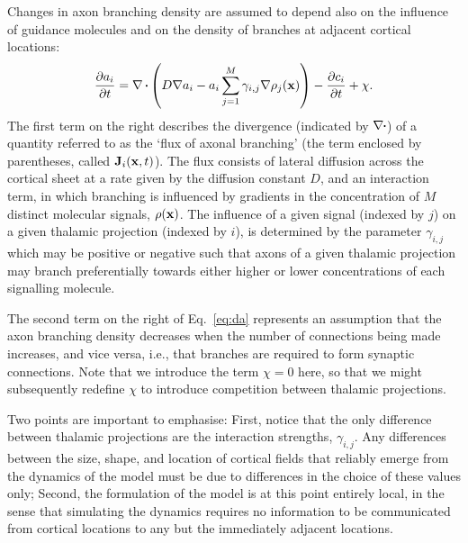 \documentclass[9pt,twocolumn,twoside,lineno]{pnas-new}
\begin{document}
Changes in axon branching density are assumed to depend also on the influence
of guidance molecules and on the density of branches at adjacent cortical
locations:
%
\begin{equation} \label{eq:da}
\frac{\partial a_i}{\partial t} = \nabla\vcdot\left(D \nabla a_i-a_i\sum_{j=1}^{M} \gamma_{i,j}\nabla \rho_j(\mb{x})\right) - \frac{\partial c_i}{\partial t} + \chi.
\end{equation}
%
The first term on the right describes the divergence (indicated by
$\nabla\vcdot$) of a quantity referred to as the `flux of axonal branching'
(the term enclosed by parentheses, called $\mathbf{J}_i(\mathbf{x},t)$).
The flux consists of lateral diffusion across the cortical sheet at a rate
given by the diffusion constant $D$, and an interaction term, in which
branching is influenced by gradients in the concentration of $M$ distinct
molecular signals, $\rho(\mathbf{x})$. The influence of a given signal (indexed by
$j$) on a given thalamic projection (indexed by $i$), is determined by the
parameter $\gamma_{i,j}$ which may be positive or negative such that axons of
a given thalamic projection may branch preferentially towards either higher or
lower concentrations of each signalling molecule.

The second term on the right of Eq.~\ref{eq:da} represents an assumption that the
axon branching density decreases when the number of connections being made
increases, and vice versa, i.e., that branches are required to form synaptic
connections. Note that we introduce the term $\chi=0$ here, so that we might
subsequently redefine $\chi$ to introduce competition between thalamic
projections.

Two points are important to emphasise: First, notice that the only
difference between thalamic projections are the interaction strengths,
$\gamma_{i,j}$. Any differences between the size, shape, and location of
cortical fields that reliably emerge from the dynamics of the model must be
due to differences in the choice of these values only; Second, the formulation
of the model is at this point entirely local, in the sense that simulating the
dynamics requires no information to be communicated from cortical locations to
any but the immediately adjacent locations.
\end{document}
